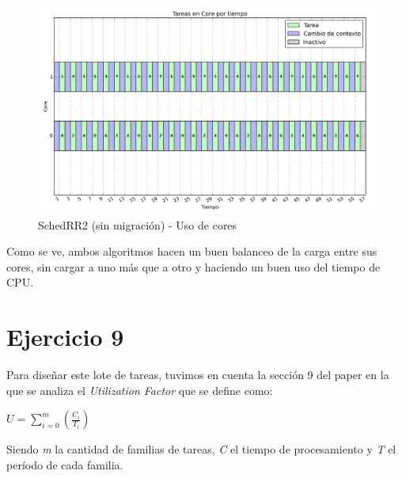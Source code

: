 \documentclass[a4paper,11pt]{article}
\begin{document}
		\begin{figure}[H]
		\centering
		\includegraphics[scale=.4, width=1\textwidth]{graficos/ej8-b2-2c-cores}
		\caption{SchedRR2 (sin migración) - Uso de cores}
		\end{figure}	

		Como se ve, ambos algoritmos hacen un buen balanceo de la carga entre sus cores, sin cargar a uno más que a otro y haciendo un buen uso del tiempo de CPU.
		
\pagebreak		

\section{Ejercicio 9}

Para diseñar este lote de tareas, tuvimos en cuenta la sección 9 del paper en la que se analiza el \emph{Utilization Factor} que se define como:

\begin{center}
$\displaystyle U = \sum_{i=0}^{m} \left(\frac{C_i}{T_i}\right) $
\end{center}
Siendo \emph{m} la cantidad de familias de tareas, \emph{C} el tiempo de procesamiento y \emph{T} el período de cada familia.
\end{document}
